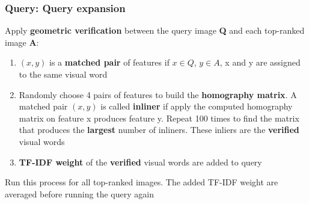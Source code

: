 \begin{frame}
	\frametitle{Query: Query expansion}
	Apply \textbf{geometric verification} between the query image \textbf{Q} and each top-ranked image \textbf{A}:
	\begin{enumerate}
		\item $(x,y)$ is a \textbf{matched pair} of features if $x \in Q$, $y \in A$, x and y are assigned to the same visual word
		\item Randomly choose 4 pairs of features to build the \textbf{homography matrix}. A matched pair $(x,y)$ is called \textbf{inliner} if apply the computed homography matrix on feature x produces feature y. Repeat 100 times to find the matrix that produces the \textbf{largest} number of inliners. These inliers are the \textbf{verified} visual words
		\item \textbf{TF-IDF weight} of the \textbf{verified} visual words are added to query
	\end{enumerate}
	Run this process for all top-ranked images. The added TF-IDF weight are averaged before running the query again
\end{frame}


